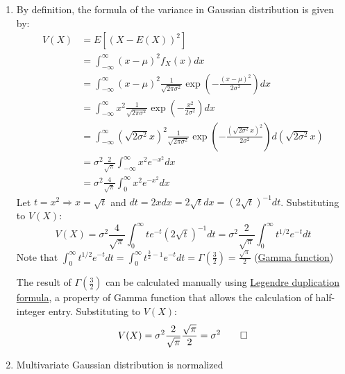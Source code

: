 \documentclass[a4paper, 10pt]{article}  %
\begin{document}
\begin{enumerate}[label=\textbf{(\alph*)}]
    \item By definition, the formula of the variance in Gaussian distribution is given by:
    \begin{align*}
        V(X) &= E[(X - E(X))^2]\\
        &= \int_{-\infty}^\infty (x - \mu)^2 f_X(x) dx \\
        &= \int_{-\infty}^\infty (x - \mu)^2 \frac{1}{\sqrt{2 \pi \sigma^2}} \exp \left( -\frac{(x - \mu)^2}{2 \sigma^2} \right) dx \\
        &= \int_{-\infty}^\infty x^2 \frac{1}{\sqrt{2 \pi \sigma^2}} \exp \left( -\frac{x^2}{2 \sigma^2} \right) dx \\
        &= \int_{-\infty}^\infty (\sqrt{2 \sigma^2}x)^2 \frac{1}{\sqrt{2 \pi \sigma^2}} \exp \left( -\frac{(\sqrt{2 \sigma^2}x)^2}{2 \sigma^2} \right) d(\sqrt{2 \sigma^2}x) \\
        &= \sigma^2 \frac{2}{\sqrt{\pi}} \int_{-\infty}^\infty x^2 e^{-x^2} dx \\
        &= \sigma^2 \frac{4}{\sqrt{\pi}} \int_0^\infty x^2 e^{-x^2} dx
    \end{align*}
    Let $t = x^2 \Rightarrow x = \sqrt{t}$ and $dt = 2xdx = 2\sqrt{t}dx = (2 \sqrt{t})^{-1}dt$. Substituting to $V(X)$:
    \[V(X) = \sigma^2 \frac{4}{\sqrt{\pi}} \int_0^\infty t e^{-t} (2 \sqrt{t})^{-1}dt 
    = \sigma^2 \frac{2}{\sqrt{\pi}} \int_0^\infty t^{1/2} e^{-t} dt\]
    Note that \(\displaystyle{\int_0^\infty t^{1/2} e^{-t} dt = \int_0^\infty t^{\frac{3}{2}-1} e^{-t} dt = \Gamma(\frac{3}{2}) = \frac{\sqrt{\pi}}{2}}\) (\href{https://en.wikipedia.org/wiki/Gamma_function}{Gamma function})
    
    The result of \(\Gamma(\frac{3}{2})\) can be calculated manually using \href{https://en.wikipedia.org/wiki/Multiplication_theorem#Gamma_function\%E2\%80\%93Legendre_formula}{Legendre duplication formula}, a property of Gamma function that allows the calculation of half-integer entry. Substituting to $V(X)$:
    \[V(X) = \sigma^2 \frac{2}{\sqrt{\pi}} \frac{\sqrt{\pi}}{2} = \sigma^2 \qed\]
    
    \item Multivariate Gaussian distribution is normalized


\end{enumerate}
\end{document}
